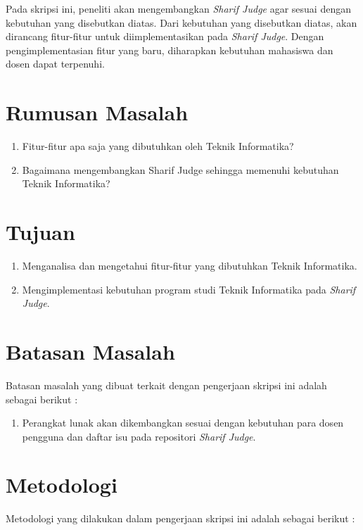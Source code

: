 Pada skripsi ini, peneliti akan mengembangkan \textit{Sharif Judge} agar sesuai dengan kebutuhan yang disebutkan diatas. Dari kebutuhan yang disebutkan diatas, akan dirancang fitur-fitur untuk diimplementasikan pada \textit{Sharif Judge}. Dengan pengimplementasian fitur yang baru, diharapkan kebutuhan mahasiswa dan dosen dapat terpenuhi.

\section{Rumusan Masalah}
\label{sec:rumusan}
\begin{enumerate}
	\item Fitur-fitur apa saja yang dibutuhkan oleh Teknik Informatika?
	\item Bagaimana mengembangkan Sharif Judge sehingga memenuhi kebutuhan Teknik Informatika?
\end{enumerate}

\section{Tujuan}
\label{sec:tujuan}
\begin{enumerate}
	\item Menganalisa dan mengetahui fitur-fitur yang dibutuhkan Teknik Informatika.
	\item Mengimplementasi kebutuhan program studi Teknik Informatika pada \textit{Sharif Judge}.
\end{enumerate}

\section{Batasan Masalah}
\label{sec:batasan}
Batasan masalah yang dibuat terkait dengan pengerjaan skripsi ini adalah sebagai berikut :
\begin{enumerate}
	\item Perangkat lunak akan dikembangkan sesuai dengan kebutuhan para dosen pengguna dan daftar isu pada repositori \textit{Sharif Judge}.
\end{enumerate}

\section{Metodologi}
\label{sec:metlit}Metodologi yang dilakukan dalam pengerjaan skripsi ini adalah sebagai berikut :

